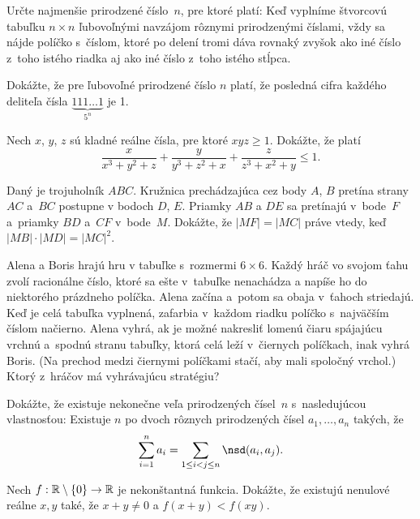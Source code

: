 {%
Určte najmenšie prirodzené číslo~$n$, pre ktoré platí: Keď vyplníme
štvorcovú tabuľku $n\times n$ ľubovoľnými navzájom rôznymi
prirodzenými číslami, vždy sa nájde políčko s~číslom, ktoré po delení tromi
dáva rovnaký zvyšok ako iné číslo z~toho istého riadka aj ako iné číslo
z~toho istého stĺpca.}

{%
Dokážte, že pre ľubovoľné prirodzené číslo $n$ platí, že posledná cifra každého deliteľa čísla $\underbrace{111\dots1}_{5^n}$ je 1.}

{%
Nech $x$, $y$, $z$ sú kladné reálne čísla, pre ktoré $xyz\ge1$. Dokážte, že platí
$$
\frac{x}{x^3+y^2+z} + \frac{y}{y^3+z^2+x} + \frac{z}{z^3+x^2+y} \le 1.
$$
}

{%
Daný je trojuholník $ABC$. Kružnica prechádzajúca cez body $A$, $B$ pretína strany $AC$ a~$BC$ postupne v bodoch $D$, $E$. Priamky $AB$ a $DE$ sa pretínajú v~bode~$F$ a~priamky $BD$ a~$CF$ v~bode~$M$. Dokážte, že $|MF| = |MC|$ práve vtedy, keď $|MB| \cdot |MD| = |MC|^2$.}

{%
Alena a Boris hrajú hru v tabuľke s~rozmermi $6\times6$. Každý hráč vo svojom ťahu zvolí racionálne číslo, ktoré sa ešte v~tabuľke nenachádza a napíše ho do niektorého prázdneho políčka. Alena začína a~potom sa obaja v~ťahoch striedajú. Keď je celá tabuľka vyplnená, zafarbia v~každom riadku políčko s~najväčším číslom načierno. Alena vyhrá, ak je možné nakresliť lomenú čiaru spájajúcu vrchnú a~spodnú stranu tabuľky, ktorá celá leží v~čiernych políčkach, inak vyhrá Boris. (Na prechod medzi čiernymi políčkami stačí, aby mali spoločný vrchol.) Ktorý z~hráčov má vyhrávajúcu stratégiu?}

{%
Dokážte, že existuje nekonečne veľa prirodzených čísel~$n$ s~nasledujúcou vlastnosťou: Existuje $n$ po dvoch rôznych prirodzených čísel $a_1,\dots,a_n$ takých, že $$\sum_{i=1}^n a_i=\sum_{1\le i< j\le n} \nsd(a_i,a_j).$$}

{%
Nech $f:\Bbb R\setminus\{0\}\rightarrow \Bbb R$ je nekonštantná funkcia. Dokážte, že existujú nenulové reálne $x,y$ také, že $x+y\ne 0$ a $f(x+y)<f(xy)$.}

